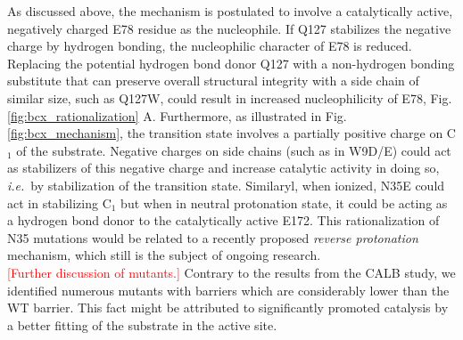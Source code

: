 As discussed above, the mechanism is postulated to involve a catalytically active, negatively charged E78 residue as the nucleophile.
If Q127 stabilizes the negative charge by hydrogen bonding, the nucleophilic character of E78 is reduced.
Replacing the potential hydrogen bond donor Q127 with a non-hydrogen bonding substitute that can preserve overall structural integrity with a side chain of similar size, such as Q127W, could result in increased nucleophilicity of E78, Fig. \ref{fig:bcx_rationalization} A.
Furthermore, as illustrated in Fig. \ref{fig:bcx_mechanism}, the transition state involves a partially positive charge on C$_1$ of the substrate.
Negative charges on side chains (such as in W9D/E) could act as stabilizers of this negative charge and increase catalytic activity in doing so, \textit{i.e.} by stabilization of the transition state.
Similaryl, when ionized, N35E could act in stabilizing C$_1$ but when in neutral protonation state, it could be acting as a hydrogen bond donor to the catalytically active E172.
This rationalization of N35 mutations would be related to a recently proposed \textit{reverse protonation} mechanism\cite{joshi2000hydrogen}, which still is the subject of ongoing research.\\
\textcolor{red}{[Further discussion of mutants.]}
Contrary to the results from the CALB study, we identified numerous mutants with barriers which are considerably lower than the WT barrier.
This fact might be attributed to significantly promoted catalysis by a better fitting of the substrate in the active site.
%


